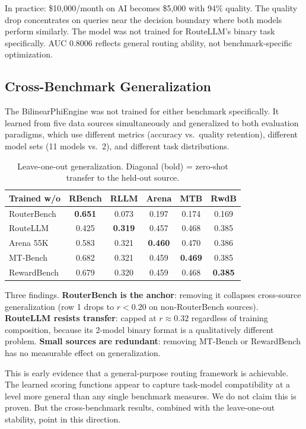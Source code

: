 In practice: \$10,000/month on AI becomes \$5,000 with 94\% quality. The quality drop concentrates on queries near the decision boundary where both models perform similarly. The model was not trained for RouteLLM's binary task specifically. AUC 0.8006 reflects general routing ability, not benchmark-specific optimization.

\subsection{Cross-Benchmark Generalization}

The BilinearPhiEngine was not trained for either benchmark specifically. It learned from five data sources simultaneously and generalized to both evaluation paradigms, which use different metrics (accuracy vs.\ quality retention), different model sets (11 models vs.\ 2), and different task distributions.

\begin{table}[h]
\centering
\caption{Leave-one-out generalization. Diagonal (bold) = zero-shot transfer to the held-out source.}
\label{tab:cross_source}
\small
\begin{tabular}{lccccc}
\toprule
\textbf{Trained w/o} & \textbf{RBench} & \textbf{RLLM} & \textbf{Arena} & \textbf{MTB} & \textbf{RwdB} \\
\midrule
RouterBench & \textbf{0.651} & 0.073 & 0.197 & 0.174 & 0.169 \\
RouteLLM & 0.425 & \textbf{0.319} & 0.457 & 0.468 & 0.385 \\
Arena 55K & 0.583 & 0.321 & \textbf{0.460} & 0.470 & 0.386 \\
MT-Bench & 0.682 & 0.321 & 0.459 & \textbf{0.469} & 0.385 \\
RewardBench & 0.679 & 0.320 & 0.459 & 0.468 & \textbf{0.385} \\
\bottomrule
\end{tabular}
\end{table}

Three findings. \textbf{RouterBench is the anchor}: removing it collapses cross-source generalization (row 1 drops to $r < 0.20$ on non-RouterBench sources). \textbf{RouteLLM resists transfer}: capped at $r \approx 0.32$ regardless of training composition, because its 2-model binary format is a qualitatively different problem. \textbf{Small sources are redundant}: removing MT-Bench or RewardBench has no measurable effect on generalization.

This is early evidence that a general-purpose routing framework is achievable. The learned scoring functions appear to capture task-model compatibility at a level more general than any single benchmark measures. We do not claim this is proven. But the cross-benchmark results, combined with the leave-one-out stability, point in this direction.
